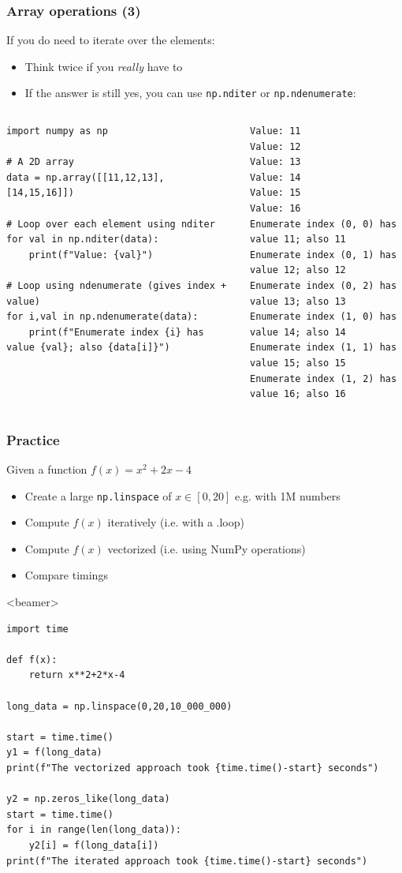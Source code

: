 \begin{frame}[fragile]
  \frametitle{Array operations (3)}
  If you do need to iterate over the elements:
  \begin{itemize}
    \item Think twice if you \emph{really} have to
    \item If the answer is still yes, you can use \lstinline|np.nditer| or \lstinline|np.ndenumerate|:
  \end{itemize}
  \pause
  \begin{columns}
    \begin{lstlisting}
import numpy as np 

# A 2D array
data = np.array([[11,12,13], [14,15,16]])

# Loop over each element using nditer
for val in np.nditer(data):
    print(f"Value: {val}")

# Loop using ndenumerate (gives index + value)
for i,val in np.ndenumerate(data):
    print(f"Enumerate index {i} has value {val}; also {data[i]}")
    \end{lstlisting}
    \begin{lstlisting}[style=PyOutput]
Value: 11
Value: 12
Value: 13
Value: 14
Value: 15
Value: 16
Enumerate index (0, 0) has value 11; also 11
Enumerate index (0, 1) has value 12; also 12
Enumerate index (0, 2) has value 13; also 13
Enumerate index (1, 0) has value 14; also 14
Enumerate index (1, 1) has value 15; also 15
Enumerate index (1, 2) has value 16; also 16
    \end{lstlisting}
  \end{columns}
\end{frame}

{\nologo
\begin{frame}[fragile]
  \frametitle{Practice}
  Given a function $\displaystyle  f(x) = x^2+2x-4 $
  \begin{itemize}
   \item Create a large \lstinline|np.linspace| of $x\in[0,20]$ e.g. with 1M numbers
   \item Compute $f(x)$ iteratively (i.e. with a .loop)
   \item Compute $f(x)$ vectorized (i.e. using NumPy operations)
   \item Compare timings
  \end{itemize}
   \pause
   \begin{onlyenv}<beamer> 
    \begin{lstlisting}[basicstyle=\tiny\ttfamily]
import time

def f(x):
    return x**2+2*x-4

long_data = np.linspace(0,20,10_000_000)

start = time.time()
y1 = f(long_data)
print(f"The vectorized approach took {time.time()-start} seconds")

y2 = np.zeros_like(long_data)
start = time.time()
for i in range(len(long_data)):
    y2[i] = f(long_data[i])
print(f"The iterated approach took {time.time()-start} seconds")
    \end{lstlisting}
    \end{onlyenv}
 \end{frame}
}

